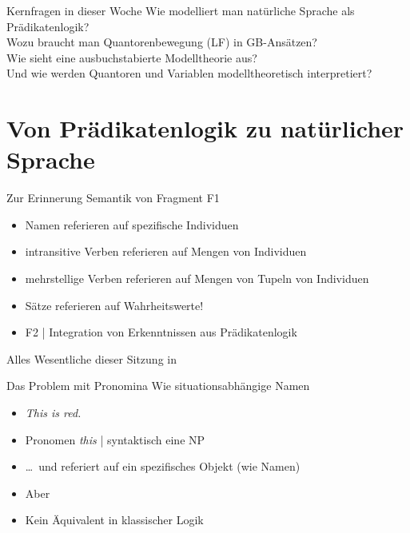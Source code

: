 \begin{frame}
  {Kernfragen in dieser Woche}
  \onslide<+->
  \onslide<+->
  \centering 
  \Large
  Wie modelliert man natürliche Sprache als Prädikatenlogik?\\
  \onslide<+->
  \Halbzeile
  Wozu braucht man \alert{Quantorenbewegung (LF)} in GB-Ansätzen?\\
  \onslide<+->
  \Halbzeile
  Wie sieht eine ausbuchstabierte \alert{Modelltheorie} aus?\\
  Und wie werden Quantoren und Variablen modelltheoretisch interpretiert?
\end{frame}

\section{Von Prädikatenlogik zu natürlicher Sprache}

\begin{frame}
  {Zur Erinnerung}
  \onslide<+->
  \onslide<+->
  Semantik von Fragment F1\\
  \Halbzeile
  \begin{itemize}[<+->]
    \item Namen referieren auf \alert{spezifische Individuen}
    \item intransitive Verben referieren auf \alert{Mengen von Individuen}
    \item mehrstellige Verben referieren auf Mengen von \alert{Tupeln von Individuen}
    \item Sätze referieren auf \alert{Wahrheitswerte}!
      \Halbzeile
    \item F2 | Integration von Erkenntnissen aus Prädikatenlogik
  \end{itemize}
  \onslide<+->
  \Zeile
  \centering 
  Alles Wesentliche dieser Sitzung in \citet[Kapitel~3]{ChierchiaMcconnellginet2000}
\end{frame}

\begin{frame}
  {Das Problem mit Pronomina}
  \onslide<+->
  \onslide<+->
  Wie situationsabhängige Namen\\
  \Halbzeile
  \begin{itemize}[<+->]
    \item[ ] \textit{\alert{This} is red.}
    \item Pronomen \alert{\textit{this}} | syntaktisch eine NP
    \item \ldots\ und referiert auf \alert{ein spezifisches Objekt} (wie Namen)\\
      \Halbzeile
    \item Aber \\
    \item Kein Äquivalent in klassischer Logik
  \end{itemize}
\end{frame}


